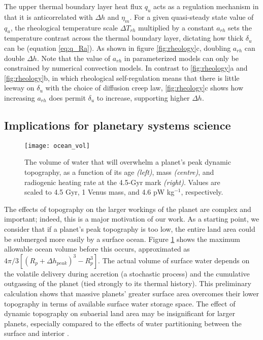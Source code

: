 The upper thermal boundary layer heat flux $q_{u}$ acts as a regulation mechanism in that it is anticorrelated with $\Delta h$ and $\eta_m$. For a given quasi-steady state value of $q_{u}$, the rheological temperature scale $\Delta T_{rh}$ multiplied by a constant $a_{rh}$ sets the temperature contrast across the thermal boundary layer, dictating how thick $\delta_{u}$ can be (equation \ref{eq:q_Ra}). As shown in figure \ref{fig:rheology}c, doubling $a_{rh}$ can double $\Delta h$. Note that the value of $a_{rh}$ in parameterized models can only be constrained by numerical convection models. In contrast to \ref{fig:rheology}a and \ref{fig:rheology}b, in which rheological self-regulation means that there is little leeway on $\delta_{u}$ with the choice of diffusion creep law, \ref{fig:rheology}c shows how increasing $a_{rh}$ does permit $\delta_{u}$ to increase, supporting higher $\Delta h$.



\subsection{Implications for planetary systems science}

\begin{figure}
  \centering
  \texttt{[image: ocean\_vol]}
\caption{The volume of water that will overwhelm a planet's peak dynamic topography, as a function of its age \textit{(left)}, mass \textit{(centre)}, and radiogenic heating rate at the 4.5-Gyr mark \textit{(right)}. Values are scaled to 4.5 Gyr, 1 Venus mass, and 4.6 pW kg$^{-1}$, respectively.}
\label{fig:ocean}
\end{figure}

The effects of topography on the larger workings of the planet are complex and important; indeed, this is a major motivation of our work. As a starting point, we consider that if a planet's peak topography is too low, the entire land area could be submerged more easily by a surface ocean. Figure \ref{fig:ocean} shows the maximum allowable ocean volume before this occurs, approximated as $4\pi/3 \left[(R_p + \Delta h_{peak} )^3 - R_p^3\right]$. The actual volume of surface water depends on the volatile delivery during accretion (a stochastic process) and the cumulative outgassing of the planet (tied strongly to its thermal history). This preliminary calculation shows that massive planets' greater surface area overcomes their lower topography in terms of available surface water storage space. The effect of dynamic topography on subaerial land area may be insignificant for larger planets, especially compared to the effects of water partitioning between the surface and interior \citep{Komacek2016}.



